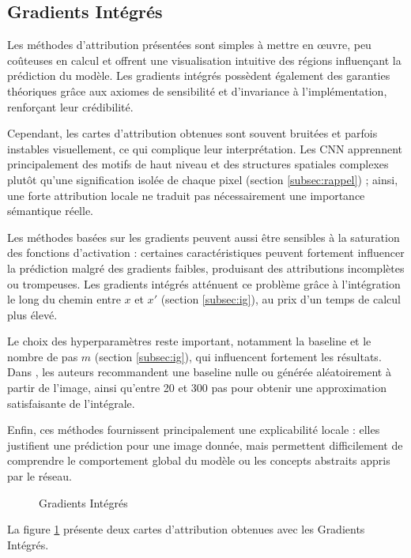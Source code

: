 \documentclass{ir}
\begin{document}
\subsection{Gradients Intégrés}

Les méthodes d'attribution présentées sont simples à mettre en œuvre, peu coûteuses en calcul et offrent une visualisation intuitive des régions influençant la prédiction du modèle.
Les gradients intégrés possèdent également des garanties théoriques grâce aux axiomes de sensibilité et d'invariance à l'implémentation, renforçant leur crédibilité.

Cependant, les cartes d'attribution obtenues sont souvent bruitées et parfois instables visuellement, ce qui complique leur interprétation.
Les CNN apprennent principalement des motifs de haut niveau et des structures spatiales complexes plutôt qu'une signification isolée de chaque pixel (section \ref{subsec:rappel}) ; ainsi, une forte attribution locale ne traduit pas nécessairement une importance sémantique réelle.

Les méthodes basées sur les gradients peuvent aussi être sensibles à la saturation des fonctions d'activation : certaines caractéristiques peuvent fortement influencer la prédiction malgré des gradients faibles, produisant des attributions incomplètes ou trompeuses.
Les gradients intégrés atténuent ce problème grâce à l'intégration le long du chemin entre $x$ et $x'$ (section \ref{subsec:ig}), au prix d'un temps de calcul plus élevé.

Le choix des hyperparamètres reste important, notamment la baseline et le nombre de pas $m$ (section \ref{subsec:ig}), qui influencent fortement les résultats.
Dans \cite{sundararajan2017axiomatic}, les auteurs recommandent une baseline nulle ou générée aléatoirement à partir de l'image, ainsi qu'entre 20 et 300 pas pour obtenir une approximation satisfaisante de l'intégrale.

Enfin, ces méthodes fournissent principalement une explicabilité locale : elles justifient une prédiction pour une image donnée, mais permettent difficilement de comprendre le comportement global du modèle ou les concepts abstraits appris par le réseau.

\begin{figure}
    \caption{Gradients Intégrés}
    \label{fig:ig1}
\end{figure}

La figure \ref{fig:ig1} présente deux cartes d'attribution obtenues avec les Gradients Intégrés.
\end{document}
